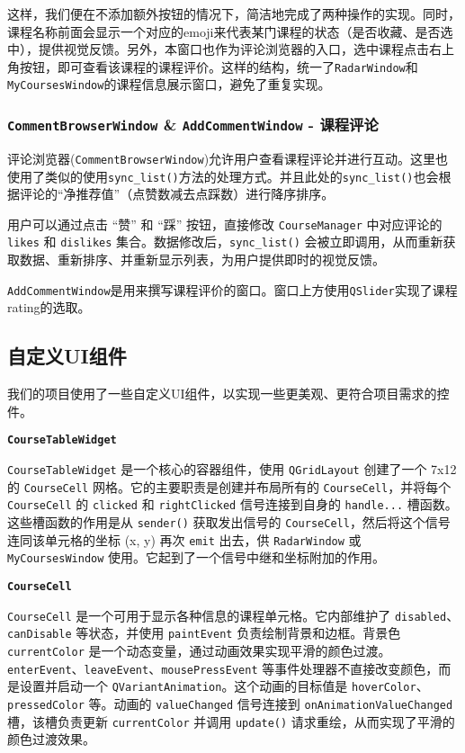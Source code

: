 \documentclass{article}
\begin{document}
这样，我们便在不添加额外按钮的情况下，简洁地完成了两种操作的实现。同时，课程名称前面会显示一个对应的emoji来代表某门课程的状态（是否收藏、是否选中），提供视觉反馈。另外，本窗口也作为评论浏览器的入口，选中课程点击右上角按钮，即可查看该课程的课程评价。这样的结构，统一了\texttt{RadarWindow}和\texttt{MyCoursesWindow}的课程信息展示窗口，避免了重复实现。

\subsubsection{\texttt{CommentBrowserWindow} \& \texttt{AddCommentWindow} - 课程评论}

评论浏览器(\texttt{CommentBrowserWindow})允许用户查看课程评论并进行互动。这里也使用了类似的使用\texttt{sync\_list()}方法的处理方式。并且此处的\texttt{sync\_list()}也会根据评论的“净推荐值”（点赞数减去点踩数）进行降序排序。

用户可以通过点击 “赞” 和 “踩” 按钮，直接修改 \texttt{CourseManager} 中对应评论的 \texttt{likes} 和 \texttt{dislikes} 集合。数据修改后，\texttt{sync\_list()} 会被立即调用，从而重新获取数据、重新排序、并重新显示列表，为用户提供即时的视觉反馈。

\texttt{AddCommentWindow}是用来撰写课程评价的窗口。窗口上方使用\texttt{QSlider}实现了课程rating的选取。

\subsection{自定义UI组件}

我们的项目使用了一些自定义UI组件，以实现一些更美观、更符合项目需求的控件。

\noindent \textbf{\texttt{CourseTableWidget}}

\texttt{CourseTableWidget} 是一个核心的容器组件，使用 \texttt{QGridLayout} 创建了一个 7x12 的 \texttt{CourseCell} 网格。它的主要职责是创建并布局所有的 \texttt{CourseCell}，并将每个 \texttt{CourseCell} 的 \texttt{clicked} 和 \texttt{rightClicked} 信号连接到自身的 \texttt{handle...} 槽函数。这些槽函数的作用是从 \texttt{sender()} 获取发出信号的 \texttt{CourseCell}，然后将这个信号连同该单元格的坐标 (x, y) 再次 \texttt{emit} 出去，供 \texttt{RadarWindow} 或 \texttt{MyCoursesWindow} 使用。它起到了一个信号中继和坐标附加的作用。

\noindent \textbf{\texttt{CourseCell}}

\texttt{CourseCell} 是一个可用于显示各种信息的课程单元格。它内部维护了 \texttt{disabled}、\texttt{canDisable} 等状态，并使用 \texttt{paintEvent} 负责绘制背景和边框。背景色 \texttt{currentColor} 是一个动态变量，通过动画效果实现平滑的颜色过渡。\texttt{enterEvent}、\texttt{leaveEvent}、\texttt{mousePressEvent} 等事件处理器不直接改变颜色，而是设置并启动一个 \texttt{QVariantAnimation}。这个动画的目标值是 \texttt{hoverColor}、\texttt{pressedColor} 等。动画的 \texttt{valueChanged} 信号连接到 \texttt{onAnimationValueChanged} 槽，该槽负责更新 \texttt{currentColor} 并调用 \texttt{update()} 请求重绘，从而实现了平滑的颜色过渡效果。
\end{document}
